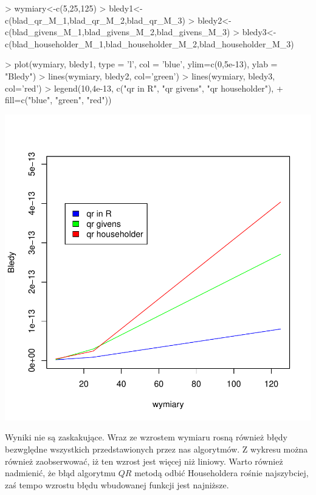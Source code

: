 \documentclass[12pt,a4paper]{report}
\newcommand{\mx}[1]{{#1}}
\begin{document}
\begin{Schunk}
\begin{Sinput}
> wymiary<-c(5,25,125)
> bledy1<-c(blad_qr_M_1,blad_qr_M_2,blad_qr_M_3)
> bledy2<-c(blad_givens_M_1,blad_givens_M_2,blad_givens_M_3)
> bledy3<-c(blad_householder_M_1,blad_householder_M_2,blad_householder_M_3)
\end{Sinput}
\end{Schunk}

\begin{Schunk}
\begin{Sinput}
> plot(wymiary, bledy1, type = 'l', col = 'blue', ylim=c(0,5e-13), ylab = "Bledy")
> lines(wymiary, bledy2, col='green')
> lines(wymiary, bledy3, col='red')
> legend(10,4e-13, c("qr in R", "qr givens", "qr householder"), 
+        fill=c("blue", "green", "red"))
\end{Sinput}
\end{Schunk}
\includegraphics{licencjat-027}

Wyniki nie są zaskakujące. Wraz ze wzrostem wymiaru rosną również błędy bezwględne wszystkich przedstawionych przez nas algorytmów. Z wykresu można również zaobserwować, iż ten wzrost jest więcej niż liniowy. Warto również nadmienić, że błąd algorytmu $\mx{QR}$ metodą odbić Householdera rośnie najszybciej, zaś tempo wzrostu błędu wbudowanej funkcji jest najniższe. 
\end{document}
